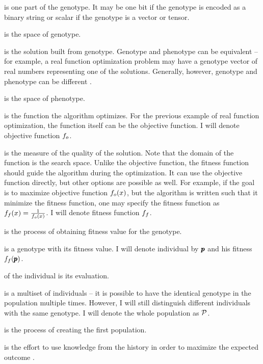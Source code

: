  is one part of the genotype. It may be one bit if the genotype is encoded as a binary string or scalar if the genotype is a vector or tensor. 

 is the space of genotype.

 is the solution built from genotype. Genotype and phenotype can be equivalent -- for example, a real function optimization problem may have a genotype vector of real numbers representing one of the solutions. Generally, however, genotype and phenotype can be different \citep{GeneticAlgorithmEssentials}.

 is the space of phenotype.

 is the function the algorithm optimizes. For the previous example of real function optimization, the function itself can be the objective function. I will denote objective function $f_o$.

 is the measure of the quality of the solution. Note that the domain of the function is the search space. Unlike the objective function, the fitness function should guide the algorithm during the optimization. It can use the objective function directly, but other options are possible as well. For example, if the goal is to maximize objective function $f_o(x)$, but the algorithm is written such that it minimize the fitness function, one may specify the fitness function as $f_f(x)=\frac{1}{f_o(x)}$. I will denote fitness function $f_f$.

 is the process of obtaining fitness value for the genotype.

 is a genotype with its fitness value. I will denote individual by $\pmb{p}$ and his fitness $f_f(\pmb{p})$.

 of the individual is its evaluation. 

 is a multiset of individuals -- it is possible to have the identical genotype in the population multiple times. However, I will still distinguish different individuals with the same genotype. I will denote the whole population as $\mathcal{P}$.

 is the process of creating the first population.

 is the effort to use knowledge from the history in order to maximize the expected outcome \citep{SelfAdaptiveFeaturesInRealParameterEvolutionaryAlgorithms}.

